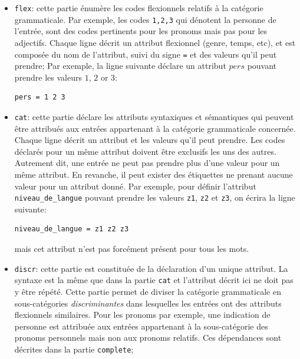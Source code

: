 \begin{itemize}
  \item \verb$flex$: cette partie énumère les codes flexionnels
 relatifs à la catégorie grammaticale. Par exemple, les codes \verb$1,2,3$ qui dénotent
 la personne de l’entrée, sont des codes pertinents pour les pronoms mais pas pour les adjectifs. 
 Chaque ligne décrit un attribut flexionnel (genre, temps, etc), et est composée du nom
 de l’attribut, suivi du signe \verb$=$ et des valeurs qu’il peut prendre;
 Par exemple, la ligne suivante déclare un attribut $pers$ pouvant prendre les valeurs
 $1$, $2$ or $3$:

\begin{verbatim}
pers = 1 2 3
\end{verbatim}

\item \verb$cat$: cette partie déclare les attributs syntaxiques
et sémantiques qui peuvent être attribués
aux entrées appartenant à la catégorie grammaticale concernée. Chaque ligne décrit
un attribut et les valeurs qu’il peut prendre. Les codes déclarés pour un même attribut
doivent être exclusifs les uns des autres. Autrement dit, une entrée ne peut pas
prendre plus d’une valeur pour un même attribut.
En revanche, il peut exister des étiquettes ne prenant aucune valeur pour un attribut donné.
Par exemple, pour définir l’attribut \verb$niveau_de_langue$ pouvant prendre les valeurs 
\verb$z1$, \verb$z2$ et \verb$z3$, on écrira la ligne suivante:


\begin{verbatim}
niveau_de_langue = z1 z2 z3
\end{verbatim}

mais cet attribut n'est pas forcément présent pour tous les mots.

\item \verb$discr$: cette partie est constituée de la déclaration
d’un unique attribut. La syntaxe est la même que dans la partie \verb$cat$ et l’attribut
décrit ici ne doit pas y être répété. Cette partie permet de diviser la catégorie grammaticale
en sous-catégories \textit{discriminantes} dans lesquelles les entrées ont des attributs
flexionnels similaires. Pour les pronoms par exemple, une indication de personne est attribuée
aux entrées appartenant à la sous-catégorie des pronoms personnels mais non aux pronoms relatifs.
Ces dépendances sont décrites dans la partie \verb$complete$;


\end{itemize}
